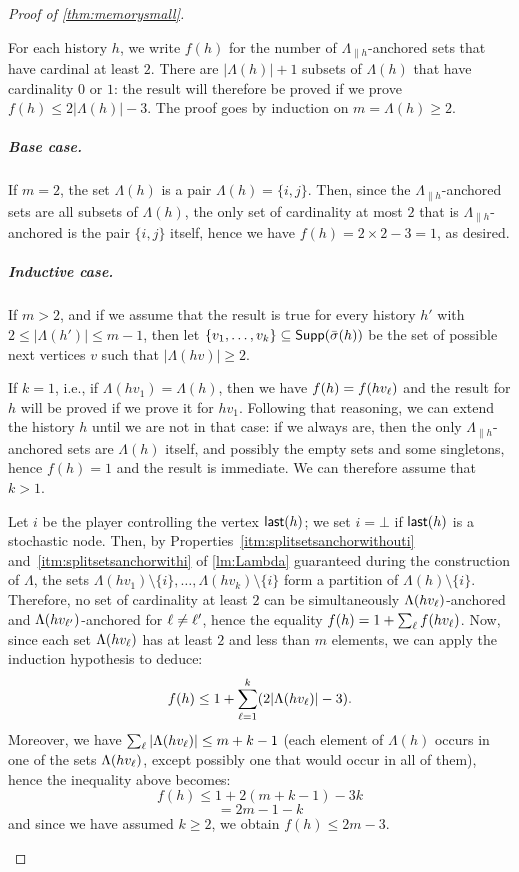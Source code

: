 \begin{proof}[Proof of \cref{thm:memorysmall}]
\begin{claimproof}
    For each history $h$, we write $f(h)$ for the number of $\Lambda_{\|h}$-anchored sets that have cardinal at least $2$.
    There are $|\Lambda(h)|+1$ subsets of $\Lambda(h)$ that have cardinality $0$ or $1$: the result will therefore be proved if we prove $f(h) \leq 2|\Lambda(h)| - 3$.
    The proof goes by induction on $m = \Lambda(h) \geq 2$.

    \subparagraph*{Base case.}
    If $m = 2$, the set $\Lambda(h)$ is a pair $\Lambda(h) = \{i, j\}$.
    Then, since the $\Lambda_{\|h}$-anchored sets are all subsets of $\Lambda(h)$, the only set of cardinality at most $2$ that is $\Lambda_{\|h}$-anchored is the pair $\{i, j\}$ itself, hence we have $f(h) = 2 \times 2 - 3 = 1$, as desired.

    \subparagraph*{Inductive case.}
    If $m > 2$, and if we assume that the result is true for every history $h'$ with $2 \leq |\Lambda(h')| \leq m-1$, then let $\{v_1, \dots, v_k\} \subseteq \mathsf{Supp}({\bar{\sigma}}(h))$ be the set of possible next vertices $v$ such that $|\Lambda(hv)| \geq 2$.

    If $k = 1$, i.e., if $\Lambda(hv_1) = \Lambda(h)$, then we have $f(h) = f(hv_\ell)$ and the result for $h$ will be proved if we prove it for $hv_1$.
    Following that reasoning, we can extend the history $h$ until we are not in that case: if we always are, then the only $\Lambda_{\|h}$-anchored sets are $\Lambda(h)$ itself, and possibly the empty sets and some singletons, hence $f(h) = 1$ and the result is immediate.
    We can therefore assume that $k > 1$.

    Let $i$ be the player controlling the vertex $\mathsf{last}(h)$; we set $i = \bot$ if $\mathsf{last}(h)$ is a stochastic node.
    Then, by Properties~\ref{itm:splitsetsanchorwithouti} and~\ref{itm:splitsetsanchorwithi} of \cref{lm:Lambda}  guaranteed during the construction of $\Lambda$, the sets $\Lambda(hv_1) \setminus \{i\}, \dots, \Lambda(hv_k) \setminus \{i\}$ form a partition of $\Lambda(h) \setminus \{i\}$.
    Therefore, no set of cardinality at least $2$ can be simultaneously $\Lambda(hv_\ell)$-anchored and $\Lambda(hv_{\ell'})$-anchored for $\ell \neq \ell'$, hence the equality $f(h) = 1+\sum_\ell f(hv_\ell)$.
    Now, since each set $\Lambda(hv_\ell)$ has at least $2$ and less than $m$ elements, we can apply the induction hypothesis to deduce:
    $$f(h) \leq 1 + \sum_{\ell=1}^k (2|\Lambda(hv_\ell)| - 3).$$
    Moreover, we have $\sum_\ell |\Lambda(hv_\ell)| \leq m + k - 1$ (each element of $\Lambda(h)$ occurs in one of the sets $\Lambda(hv_\ell)$, except possibly one that would occur in all of them), hence the inequality above becomes:
    $$f(h) \leq 1 + 2(m+k-1) -3k$$
    $$= 2m - 1 - k$$
    and since we have assumed $k \geq 2$, we obtain $f(h) \leq 2m-3$.
\end{claimproof}    


\end{proof}
